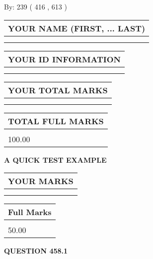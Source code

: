 \documentclass[12pt]{article}
\begin{document}
   
\hspace{1.0in} By: 
 239 ( 416 ,  613 )
   
   
   
   
\newpage 
\setcounter{page}{ 
   458001 } 
   
   
   
   
\noindent\begin{tabular}{|l|}
\hline
YOUR NAME (FIRST, ... LAST)  \\
\hline
 \\ 
 \\ 
\hline
\end{tabular}
\hspace{0.05in} \begin{tabular}{|l|}
\hline
 YOUR   ID   INFORMATION  \\
\hline
 \\ 
 \\ 
\hline
\end{tabular}
   
   
\vspace{0.2in}\noindent\begin{tabular}{|l|}
\hline
YOUR TOTAL MARKS  \\
\hline
 \\ 
 \\ 
\hline
\end{tabular}
\hspace{0.05in} \begin{tabular}{|l|}
\hline
TOTAL FULL MARKS  \\
\hline
 \\ 
100.00 \\
\hline
\end{tabular}
   
   
 \vspace{0.2in}
{\LARGE {\textbf{ A QUICK TEST EXAMPLE}}}
   
   
  
\vspace{0.2in}
  
\noindent\begin{tabular}{|l|}
\hline
 YOUR MARKS  \\
\hline
 \\ 
 \\ 
\hline
\end{tabular}
\hspace{0.05in} \begin{tabular}{|l|}
\hline
 Full Marks  \\
\hline
 \\ 
50.00 \\
\hline
\end{tabular}
{\textbf{\Large{QUESTION
458.1 
}}}
  
\end{document}

